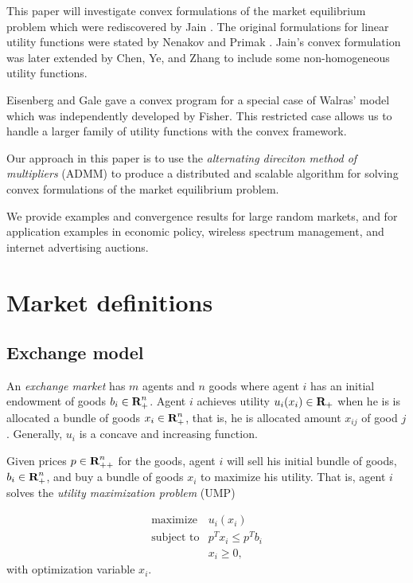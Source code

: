\documentclass[12pt]{article}
\begin{document}
This paper will investigate convex formulations of the market
equilibrium problem which were rediscovered by Jain \cite{jain2007polynomial}.
The original formulations for linear utility functions
were stated by Nenakov and Primak \cite{nenakov1983algorithm}.
Jain's convex formulation was later extended by Chen, Ye, and Zhang \cite{chen2007note, chen2010equilibrium} to include some non-homogeneous
utility functions.

Eisenberg and Gale \cite{eisenberg1959consensus, gale1960theory, eisenberg1961aggregation} gave a convex program for a special case of Walras' model which was independently developed by Fisher. %
This restricted case allows us to handle a larger family of utility functions
with the convex framework.

Our approach in this paper is to use the \emph{alternating direciton method of multipliers} (ADMM) \cite{boyd2011distributed} to produce a distributed and scalable algorithm for solving convex formulations of the market equilibrium problem.

We provide examples and convergence results for large random markets, and 
for application examples in economic policy, wireless spectrum management,
and internet advertising auctions.

\section{Market definitions}
\subsection{Exchange model}
An \emph{exchange market} has $m$ agents and $n$ goods where
agent $i$ has an initial endowment of goods $b_i \in {\mbox{\bf R}}_+^n$.
Agent $i$ achieves utility $u_i(x_i) \in {\mbox{\bf R}}_+$ when he is is allocated a
bundle of goods $x_i \in {\mbox{\bf R}}^n_{+}$,
that is, he is allocated amount $x_{ij}$ of good $j$.
Generally, $u_i$ is a concave and increasing function.

Given prices $p \in {\mbox{\bf R}}^n_{++}$ for the goods, agent $i$ will sell his
initial bundle of goods, $b_i \in {\mbox{\bf R}}^n_+ $, and buy a bundle of goods
$x_i$ to maximize his utility.
That is, agent $i$ solves the \emph{utility maximization problem} (UMP)

\begin{equation}
\label{p-ump}
\begin{array}{ll}
\mbox{maximize} & u_i(x_i) \\
\mbox{subject to} & p^T x_i \leq p^T b_i \\
& x_i \geq 0,
\end{array}
\end{equation}
with optimization variable $x_i$.
\end{document}
